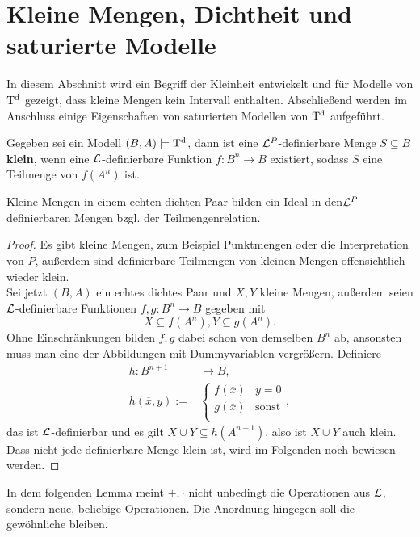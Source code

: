 \section{Kleine Mengen, Dichtheit und saturierte Modelle}
In diesem Abschnitt wird ein Begriff der Kleinheit entwickelt und für Modelle von $\operatorname{T^d}$ gezeigt, dass kleine Mengen kein Intervall enthalten. Abschließend werden im Anschluss einige Eigenschaften von saturierten Modellen von $\operatorname{T^d}$ aufgeführt.
\begin{definition}
	Gegeben sei ein Modell $(B,A)\models\operatorname{T^d}$, dann ist eine $\mathcal{L}^P$-definierbare Menge $S\subseteq B$ \textbf{klein}, wenn eine $\mathcal{L}$-definierbare Funktion $f:B^n\rightarrow B$ existiert, sodass $S$ eine Teilmenge von $f(A^n)$ ist.
\end{definition}

\begin{lemma}
	Kleine Mengen in einem echten dichten Paar bilden ein Ideal in den\linebreak $\mathcal{L}^P$-definierbaren Mengen bzgl. der Teilmengenrelation.
\end{lemma}
\begin{proof}
	Es gibt kleine Mengen, zum Beispiel Punktmengen oder die Interpretation von $P$, außerdem sind definierbare Teilmengen von kleinen Mengen offensichtlich wieder klein.\\
	Sei jetzt $(B,A)$ ein echtes dichtes Paar und $X,Y$ kleine Mengen, außerdem seien\linebreak $\mathcal{L}$-definierbare Funktionen $f,g:B^n\rightarrow B$ gegeben mit $$X\subseteq f(A^n),Y\subseteq g(A^n).$$ Ohne Einschränkungen bilden $f,g$ dabei schon von demselben $B^n$ ab, ansonsten muss man eine der Abbildungen mit Dummyvariablen vergrößern. Definiere
	\begin{align*}
	h:B^{n+1}&\rightarrow B,\\
	h(\overline{x},y):=&\left\{\begin{array}{ll}
	f(\overline{x})&y=0\\
	g(\overline{x})&\text{sonst}\\
	\end{array}\right.,
	\end{align*}
	das ist $\mathcal{L}$-definierbar und es gilt $X\cup Y\subseteq h(A^{n+1})$, also ist $X\cup Y$ auch klein.\\
	Dass nicht jede definierbare Menge klein ist, wird im Folgenden noch bewiesen werden.
\end{proof}

In dem folgenden Lemma meint $+,\cdot$ nicht unbedingt die Operationen aus $\mathcal{L}$, sondern neue, beliebige Operationen. Die Anordnung hingegen soll die gewöhnliche bleiben.

